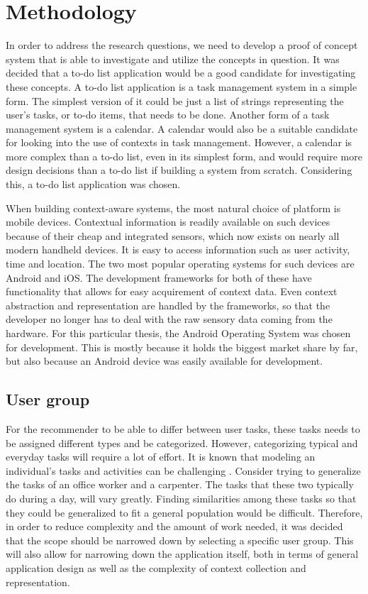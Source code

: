 \chapter{Methodology}
\label{chap:methodology}

In order to address the research questions, we need to develop a proof of concept system that is able to investigate and utilize the concepts in question. It was decided that a to-do list application would be a good candidate for investigating these concepts. A to-do list application is a task management system in a simple form. The simplest version of it could be just a list of strings representing the user's tasks, or to-do items, that needs to be done. Another form of a task management system is a calendar. A calendar would also be a suitable candidate for looking into the use of contexts in task management. However, a calendar is more complex than a to-do list, even in its simplest form, and would require more design decisions than a to-do list if building a system from scratch. Considering this, a to-do list application was chosen.

When building context-aware systems, the most natural choice of platform is mobile devices. Contextual information is readily available on such devices because of their cheap and integrated sensors, which now exists on nearly all modern handheld devices. It is easy to access information such as user activity, time and location. The two most popular operating systems for such devices are Android and iOS. The development frameworks for both of these have functionality that allows for easy acquirement of context data. Even context abstraction and representation are handled by the frameworks, so that the developer no longer has to deal with the raw sensory data coming from the hardware. For this particular thesis, the Android Operating System was chosen for development. This is mostly because it holds the biggest market share by far, but also because an Android device was easily available for development.




\section{User group}
For the recommender to be able to differ between user tasks, these tasks needs to be assigned different types and be categorized. However, categorizing typical and everyday tasks will require a lot of effort. It is known that modeling an individual's tasks and activities can be challenging \cite{refanidis2010constraint}. Consider trying to generalize the tasks of an office worker and a carpenter. The tasks that these two typically do during a day, will vary greatly. Finding similarities among these tasks so that they could be generalized to fit a general population would be difficult. Therefore, in order to reduce complexity and the amount of work needed, it was decided that the scope should be narrowed down by selecting a specific user group. This will also allow for narrowing down the application itself, both in terms of general application design as well as the complexity of context collection and representation.

